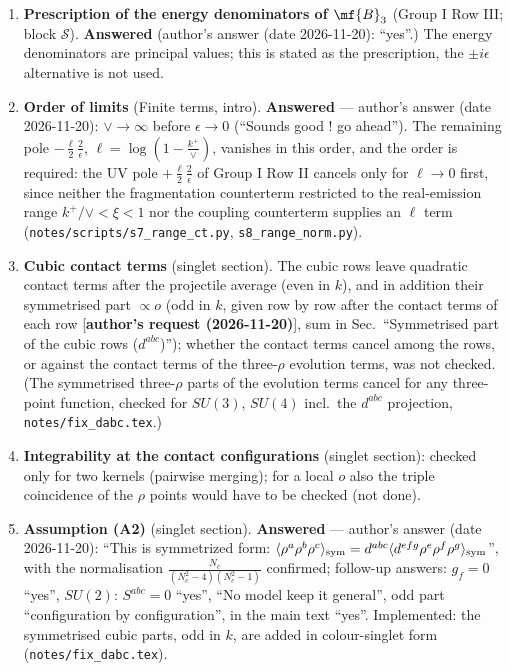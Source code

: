 {\begin{enumerate}
\item \textbf{Prescription of the energy denominators of $\mf{B}_{3}$} (Group I Row III; block $\mathcal{S}$). \textbf{Answered} (author's answer (date 2026-11-20): ``yes''.) The energy denominators are principal values; this is stated as the prescription, the $\pm i\epsilon$ alternative is not used.
\item \textbf{Order of limits} (Finite terms, intro). \textbf{Answered} --- author's answer (date 2026-11-20): $\vee\to\infty$ before $\epsilon\to0$ (``Sounds good ! go ahead''). The remaining pole $-\frac{\ell}{2}\frac{2}{\epsilon}$, $\ell=\log(1-\frac{k^{+}}{\vee})$, vanishes in this order, and the order is required: the UV pole $+\frac{\ell}{2}\frac{2}{\epsilon}$ of Group I Row II cancels only for $\ell\to0$ first, since neither the fragmentation counterterm restricted to the real-emission range $k^{+}/\vee<\xi<1$ nor the coupling counterterm supplies an $\ell$ term (\texttt{notes/scripts/s7\_range\_ct.py}, \texttt{s8\_range\_norm.py}).
\item \textbf{Cubic contact terms} (singlet section). The cubic rows leave quadratic contact terms after the projectile average (even in $k$), and in addition their symmetrised part $\propto o$ (odd in $k$, given row by row after the contact terms of each row [\textbf{author's request (2026-11-20)}], sum in Sec.~``Symmetrised part of the cubic rows ($d^{abc}$)''); whether the contact terms cancel among the rows, or against the contact terms of the three-$\rho$ evolution terms, was not checked. (The symmetrised three-$\rho$ parts of the evolution terms cancel for any three-point function, checked for $SU(3)$, $SU(4)$ incl.\ the $d^{abc}$ projection, \texttt{notes/fix\_dabc.tex}.)
\item \textbf{Integrability at the contact configurations} (singlet section): checked only for two kernels (pairwise merging); for a local $o$ also the triple coincidence of the $\rho$ points would have to be checked (not done).
\item \textbf{Assumption (A2)} (singlet section). \textbf{Answered} --- author's answer (date 2026-11-20): ``This is symmetrized form: $\langle\rho^{a}\rho^{b}\rho^{c}\rangle_{\rm sym}=d^{abc}\langle d^{efg}\rho^{e}\rho^{f}\rho^{g}\rangle_{\rm sym}$'', with the normalisation $\frac{N_{c}}{(N_{c}^{2}-4)(N_{c}^{2}-1)}$ confirmed; follow-up answers: $g_{f}=0$ ``yes'', $SU(2)$: $S^{abc}=0$ ``yes'', ``No model keep it general'', odd part ``configuration by configuration'', in the main text ``yes''. Implemented: the symmetrised cubic parts, odd in $k$, are added in colour-singlet form (\texttt{notes/fix\_dabc.tex}).

\end{enumerate}}
